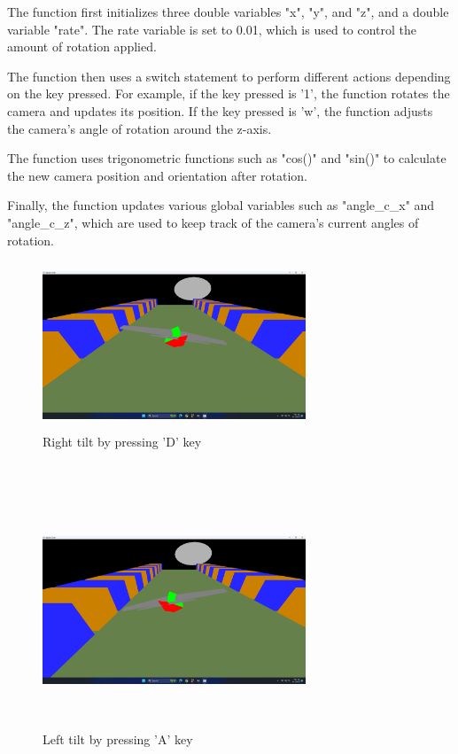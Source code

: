\documentclass[12pt,a4]{article}
\begin{document}
{The function first initializes three double variables "x", "y", and "z", and a double variable "rate". The rate variable is set to 0.01, which is used to control the amount of rotation applied.

The function then uses a switch statement to perform different actions depending on the key pressed. For example, if the key pressed is '1', the function rotates the camera and updates its position. If the key pressed is 'w', the function adjusts the camera's angle of rotation around the z-axis.

The function uses trigonometric functions such as "cos()" and "sin()" to calculate the new camera position and orientation after rotation.

Finally, the function updates various global variables such as "angle\_c\_x" and "angle\_c\_z", which are used to keep track of the camera's current angles of rotation.\\
\begin{figure}[h]
    \centering
    \includegraphics[width=0.7\textwidth, height=5cm]{Screenshot (51).png}
    \caption{Right tilt by pressing 'D' key}
    \label{fig:my_label}
\end{figure}\\

\begin{figure}[h]
    \centering
    \includegraphics[width=0.7\textwidth, height=7cm]{Screenshot (50).png}
    \caption{Left tilt by pressing 'A' key}
    \label{fig:my_label}
\end{figure}\\

}
\end{document}
